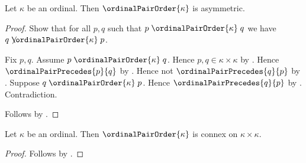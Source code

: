 \begin{proposition}\label{ordinal_pair_order_asymmetric}
    Let $\kappa$ be an ordinal.
    Then $\ordinalPairOrder{\kappa}$ is asymmetric.
\end{proposition}
\begin{proof}
    Show that for all $p,q$ such that
        $p\mathrel{\ordinalPairOrder{\kappa}}q$ we have
        $q\not\mathrel{\ordinalPairOrder{\kappa}}p$.
    \begin{subproof}
        Fix $p,q$.
        Assume $p\mathrel{\ordinalPairOrder{\kappa}}q$.
        Hence $p,q\in\kappa\times\kappa$
            by .
        Hence $\ordinalPairPrecedes{p}{q}$
            by .
        Hence not $\ordinalPairPrecedes{q}{p}$
            by .
        Suppose $q\mathrel{\ordinalPairOrder{\kappa}}p$.
        Hence $\ordinalPairPrecedes{q}{p}$
            by .
        Contradiction.
    \end{subproof}
    Follows by .
\end{proof}

\begin{proposition}\label{ordinal_pair_order_connex}
    Let $\kappa$ be an ordinal.
    Then $\ordinalPairOrder{\kappa}$ is connex on $\kappa\times\kappa$.
\end{proposition}
\begin{proof}
    Follows by
        .
\end{proof}

